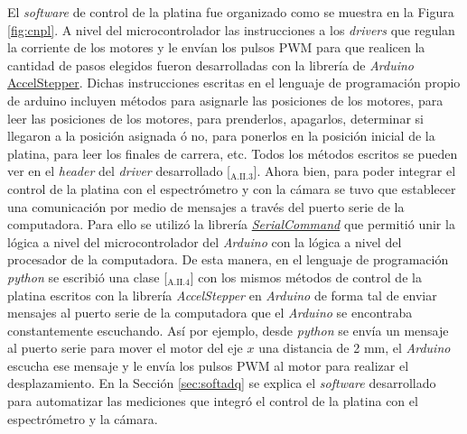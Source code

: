 El \textit{software} de control de la platina fue organizado como se muestra en la Figura \ref{fig:cnpl}. A nivel del microcontrolador las instrucciones a los \textit{drivers} que regulan la corriente de los motores y le envían los pulsos PWM para que realicen la cantidad de pasos elegidos fueron desarrolladas con la librería de \textit{Arduino} \href{https://www.airspayce.com/mikem/arduino/AccelStepper/}{AccelStepper}. Dichas instrucciones escritas en el lenguaje de programación propio de arduino incluyen métodos para asignarle las posiciones de los motores, para leer las posiciones de los motores, para prenderlos, apagarlos, determinar si llegaron a la posición asignada ó no, para ponerlos en la posición inicial de la platina, para leer los finales de carrera, etc. Todos los métodos escritos se pueden ver en el \textit{header} del \textit{driver} desarrollado [\href{https://github.com/jrr1984/open_frame_XYStage/tree/master/ino_main}{\faGithub$_{\text{A.II}.3}$}].
Ahora bien, para poder integrar el control de la platina con el espectrómetro y con la cámara se tuvo que establecer una comunicación por medio de mensajes a través del puerto serie de la computadora. Para ello se utilizó la librería \href{https://github.com/kroimon/Arduino-SerialCommand}{\textit{SerialCommand}} que permitió unir la lógica a nivel del microcontrolador del \textit{Arduino} con la lógica a nivel del procesador de la computadora. De esta manera, en el lenguaje de programación \textit{python} se escribió una clase [\href{https://github.com/jrr1984/open\_frame\_XYStage/blob/master/XYStage.py}{\faGithub$_{\text{A.II}.4}$}] con los mismos métodos de control de la platina escritos con la librería \textit{AccelStepper} en \textit{Arduino} de forma tal de enviar mensajes al puerto serie de la computadora que el \textit{Arduino} se encontraba constantemente escuchando. Así por ejemplo, desde \textit{python} se envía un mensaje al puerto serie para mover el motor del eje $\textit{x}$ una distancia de 2 mm, el \textit{Arduino} escucha ese mensaje y le envía los pulsos PWM al motor para realizar el desplazamiento. En la Sección \ref{sec:softadq} se explica el \textit{software} desarrollado para automatizar las mediciones que integró el control de la platina con el espectrómetro y la cámara.

